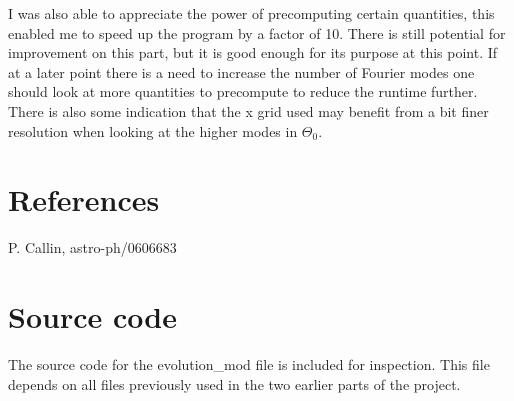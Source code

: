 \documentclass[a4paper]{report}
\begin{document}
I was also able to appreciate the power of precomputing certain quantities, this enabled me to speed up the program by a factor of 10. There is still potential for improvement on this part, but it is good enough for its purpose at this point. If at a later point there is a need to increase the number of Fourier modes one should look at more quantities to precompute to reduce the runtime further. There is also some indication that the x grid used may benefit from a bit finer resolution when looking at the higher modes in $\Theta_0$. 

\section{References}
\begin{enumerate}[label= {[}\arabic*{]} ]
 \item P. Callin, astro-ph/0606683
\end{enumerate}

\onecolumn 
\section{Source code}\label{sec:files}
The source code for the evolution\_mod file is included for inspection. This file depends on all files previously used in the two earlier parts of the project.
\end{document}
